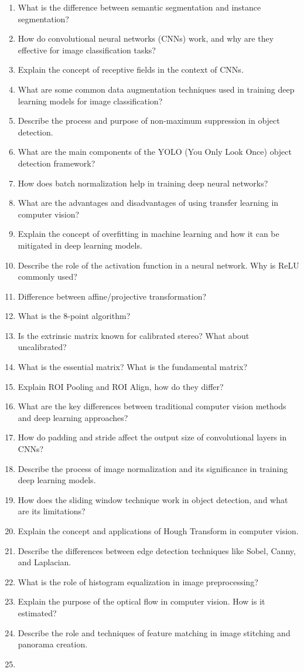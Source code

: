 \documentclass[12pt]{article}
\begin{document}
\begin{enumerate}
    \item What is the difference between semantic segmentation and instance segmentation?
    \item How do convolutional neural networks (CNNs) work, and why are they effective for image classification tasks?
    \item Explain the concept of receptive fields in the context of CNNs.
    \item What are some common data augmentation techniques used in training deep learning models for image classification?
    \item Describe the process and purpose of non-maximum suppression in object detection.
    \item What are the main components of the YOLO (You Only Look Once) object detection framework?
    \item How does batch normalization help in training deep neural networks?
    \item What are the advantages and disadvantages of using transfer learning in computer vision?
    \item Explain the concept of overfitting in machine learning and how it can be mitigated in deep learning models.
    \item Describe the role of the activation function in a neural network. Why is ReLU commonly used?
    \item Difference between affine/projective transformation? 
    \item What is the 8-point algorithm? 
    \item Is the extrinsic matrix known for calibrated stereo? What about uncalibrated? 
    \item What is the essential matrix? What is the fundamental matrix?
    \item Explain ROI Pooling and ROI Align, how do they differ?
    \item What are the key differences between traditional computer vision methods and deep learning approaches?
    \item How do padding and stride affect the output size of convolutional layers in CNNs?
    \item Describe the process of image normalization and its significance in training deep learning models.
    \item How does the sliding window technique work in object detection, and what are its limitations?
    \item Explain the concept and applications of Hough Transform in computer vision.
    \item Describe the differences between edge detection techniques like Sobel, Canny, and Laplacian.
    \item What is the role of histogram equalization in image preprocessing?
    \item Explain the purpose of the optical flow in computer vision. How is it estimated?
    \item Describe the role and techniques of feature matching in image stitching and panorama creation.
    \item 
\end{enumerate}
\end{document}

